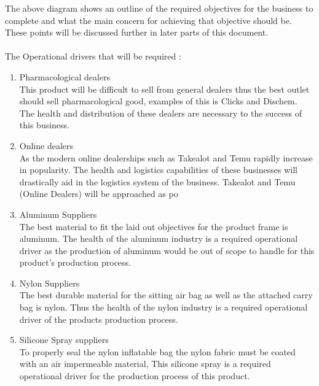       The above diagram shows an outline of the required objectives for the
      business to complete and what the main concern for achieving that 
      objective should be. These points will be discussed further in later
      parts of this document. \\ \\
      The Operational drivers that will be required : 
      \begin{enumerate}
        \item Pharmacological dealers \\
          This product will be difficult to sell from general dealers thus the
          best outlet should sell pharmacological good, examples of this is
          Clicks and Dischem.
          The health and distribution of these dealers are
          necessary to the success of this business. 
        \item Online dealers \\
          As the modern online dealerships such as Takealot and Temu rapidly
          increase in popularity. The health and logistics capabilities of these
          businesses will drastically aid in the logistics system of the
          business. Takealot and Temu (Online Dealers) will be approached as
          po
        \item Aluminum Suppliers \\ 
          The best material to fit the laid out objectives for the product
          frame is aluminum. The health of the aluminum industry is a required
          operational driver as the production of aluminum would be out of scope
          to handle for this product's production process.
        \item Nylon Suppliers \\
          The best durable material for the sitting air bag as well as the
          attached carry bag is nylon. Thus the health of the nylon industry is
          a required operational driver of the products production process.
        \item Silicone Spray suppliers \\
          To properly seal the nylon inflatable bag the nylon fabric must
          be coated with an air impermeable material, This silicone spray is a
          required operational driver for the production process of this
          product.

\end{enumerate}
